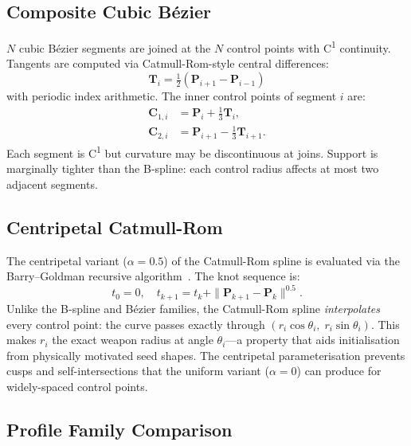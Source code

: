 \documentclass[10pt,twocolumn]{article}
\begin{document}
\subsection{Composite Cubic B\'{e}zier}
\label{sec:bezier}

$N$ cubic B\'{e}zier segments are joined at the $N$ control points with
C\textsuperscript{1} continuity.  Tangents are computed via Catmull-Rom-style
central differences:
\begin{equation}
  \boldsymbol{T}_i = \tfrac{1}{2}\!\left(\boldsymbol{P}_{i+1} - \boldsymbol{P}_{i-1}\right)
\end{equation}
with periodic index arithmetic.  The inner control points of segment $i$ are:
\begin{align}
  \boldsymbol{C}_{1,i} &= \boldsymbol{P}_i + \tfrac{1}{3}\boldsymbol{T}_i,\\
  \boldsymbol{C}_{2,i} &= \boldsymbol{P}_{i+1} - \tfrac{1}{3}\boldsymbol{T}_{i+1}.
\end{align}
Each segment is C\textsuperscript{1} but curvature may be discontinuous at
joins.  Support is marginally tighter than the B-spline: each control radius
affects at most two adjacent segments.

\subsection{Centripetal Catmull-Rom}
\label{sec:catmullrom}

The centripetal variant ($\alpha{=}0.5$) of the Catmull-Rom spline is evaluated
via the Barry--Goldman recursive algorithm~\cite{catmullrom1974}.  The knot
sequence is:
\begin{equation}
  t_0 = 0,\quad
  t_{k+1} = t_k + \|\boldsymbol{P}_{k+1} - \boldsymbol{P}_k\|^{0.5}.
\end{equation}
Unlike the B-spline and B\'{e}zier families, the Catmull-Rom spline
\emph{interpolates} every control point: the curve passes exactly through
$(r_i \cos\theta_i,\; r_i \sin\theta_i)$.  This makes $r_i$ the exact weapon
radius at angle $\theta_i$---a property that aids initialisation from
physically motivated seed shapes.  The centripetal parameterisation prevents
cusps and self-intersections that the uniform variant ($\alpha{=}0$) can
produce for widely-spaced control points.

\subsection{Profile Family Comparison}
\label{sec:profilecomp}
\end{document}
